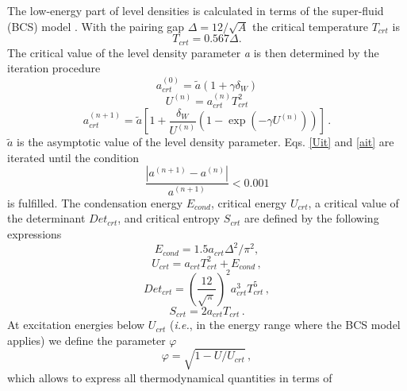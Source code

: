\documentclass[twocolumn,amsmath,amssymb,10pt,groupedaddress,a4paper]{revtex4}
\begin{document}
The low-energy part of level densities
is calculated in terms of the super-fluid (BCS) model
\cite{igna}. With the pairing gap $\Delta=12/\sqrt{A}$ the critical
temperature $T_{crt}$ is
\begin{equation}
T_{crt}=0.567\Delta.\label{Tcrt}
\end{equation}
The critical value of the level density parameter \emph{a} is then
determined by the iteration procedure
\begin{equation}
a_{crt}^{(0)}=\widetilde{a}\left(1+\gamma\delta_{W}\right)\label{ait0}
\end{equation}
\begin{equation}
U^{(n)}=a_{crt}^{(n)}T_{crt}^{2}\label{Uit}
\end{equation}
\begin{equation}
a_{crt}^{(n+1)}=\widetilde{a}\left[1+\frac{\delta_{W}}{U^{(n)}}\left(1-\exp\left(-\gamma U^{(n)}\right)\right)\right]\,.\label{ait}
\end{equation}
$\widetilde{a}$ is the asymptotic value of the level density parameter.
Eqs. \ref{Uit} and \ref{ait} are iterated until the condition
\begin{equation}
\frac{\left|a^{(n+1)}-a^{(n)}\right|}{a^{(n+1)}}<0.001\label{itercond}
\end{equation}
is fulfilled. The condensation energy $E_{cond}$, critical energy
$U_{crt}$, a critical value of the determinant $Det_{crt}$, and
critical entropy $S_{crt}$ are defined by the following expressions
\begin{equation}
E_{cond}=1.5a_{crt}\Delta^{2}/\pi^{2},\label{Econd}
\end{equation}
\begin{equation}
U_{crt}=a_{crt}T_{crt}^{2}+E_{cond}\,,\label{Ucrt}
\end{equation}
\begin{equation}
Det_{crt}=\left(\frac{12}{\sqrt{\pi}}\right)^{2}a_{crt}^{3}T_{crt}^{5}\,,\label{Detcrt}
\end{equation}
\begin{equation}
S_{crt}=2a_{crt}T_{crt}\,.\label{Scrt}
\end{equation}
At excitation energies below $U_{crt}$ ({\it i.e.}, in the energy range
\noindent where the BCS model applies) we define the parameter $\varphi$
\begin{equation}
\varphi=\sqrt{1-U/U_{crt}}\,,\label{fiign}
\end{equation}
which allows to express all thermodynamical quantities in terms of
\end{document}
